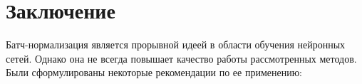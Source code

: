 \documentclass[12pt]{article}
\begin{document}
%
%
%
%
%
%
%
%
%
%
%
%
%
%
%


\newpage
\section{Заключение}

Батч-нормализация является прорывной идеей в области обучения нейронных сетей. Однако она не всегда повышает качество работы рассмотренных методов. Были сформулированы некоторые рекомендации по ее применению:
\end{document}
